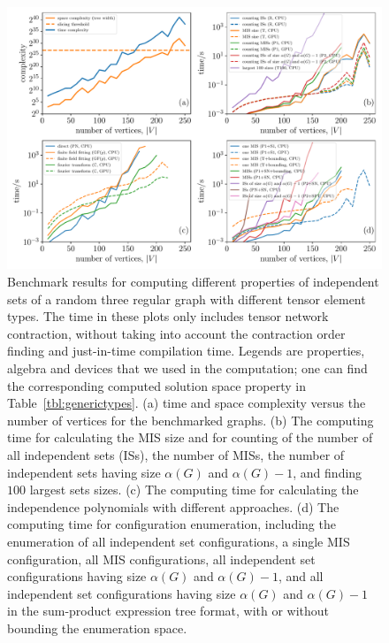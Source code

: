 \documentclass[onefignum, onetabnum]{siamart190516}
\newcommand{\<}{\langle}
\renewcommand{\>}{\rangle}
\newcommand{\Tbl}[1]{Table~\ref{#1}}
\begin{document}
\begin{figure} 
    \centering
    \includegraphics[width=\textwidth, trim={0cm 0cm 0cm 0cm}, clip]{figures/fig1.pdf}
    \caption{Benchmark results for computing different properties of independent sets of a random three regular graph with different tensor element types.
    The time in these plots only includes tensor network contraction, without taking into account the contraction order finding and just-in-time compilation time.
    Legends are properties, algebra and devices that we used in the computation; one can find the corresponding computed solution space property in \Tbl{tbl:generictypes}.
    (a) time and space complexity versus the number of vertices for the benchmarked graphs.
    (b) The computing time for calculating the MIS size and for counting of the number of all independent sets (ISs), the number of MISs,
        the number of independent sets having size $\alpha(G)$ and $\alpha(G)-1$, and finding $100$ largest sets sizes.
    (c) The computing time for calculating the independence polynomials with different approaches.
    (d) The computing time for configuration enumeration, including the enumeration of all independent set configurations, a single MIS configuration, all MIS configurations,
    all independent set configurations having size $\alpha(G)$ and $\alpha(G)-1$, and all independent set configurations having size $\alpha(G)$ and $\alpha(G)-1$ in the sum-product expression tree format,
    with or without bounding the enumeration space.
    }
    \label{fig:benchmark}
\end{figure}
\end{document}
